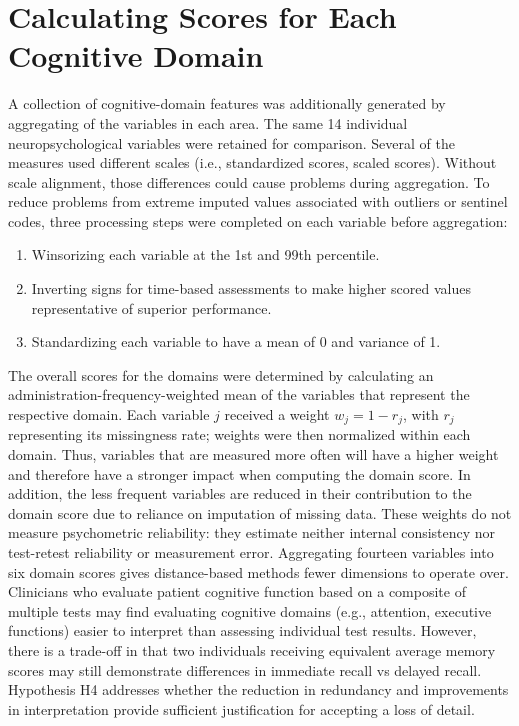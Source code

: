 \section{Calculating Scores for Each Cognitive Domain}\label{sec:domain_scores}
A collection of cognitive-domain features was additionally generated by aggregating of the variables in each area. The same 14 individual neuropsychological variables were retained for comparison. Several of the measures used different scales (i.e., standardized scores, scaled scores). Without scale alignment, those differences could cause problems during aggregation. To reduce problems from extreme imputed values associated with outliers or sentinel codes, three processing steps were completed on each variable before aggregation:

\begin{enumerate}
\item Winsorizing each variable at the 1st and 99th percentile.
\item Inverting signs for time-based assessments to make higher scored values representative of superior performance.
\item Standardizing each variable to have a mean of 0 and variance of 1.
\end{enumerate}

The overall scores for the domains were determined by calculating an administration-frequency-weighted mean of the variables that represent the respective domain. Each variable \(j\) received a weight \(w_j = 1 - r_j\), with \(r_j\) representing its missingness rate; weights were then normalized within each domain. Thus, variables that are measured more often will have a higher weight and therefore have a stronger impact when computing the domain score. In addition, the less frequent variables are reduced in their contribution to the domain score due to reliance on imputation of missing data. These weights do not measure psychometric reliability: they estimate neither internal consistency nor test-retest reliability or measurement error. Aggregating fourteen variables into six domain scores gives distance-based methods fewer dimensions to operate over. Clinicians who evaluate patient cognitive function based on a composite of multiple tests may find evaluating cognitive domains (e.g., attention, executive functions) easier to interpret than assessing individual test results. However, there is a trade-off in that two individuals receiving equivalent average memory scores may still demonstrate differences in immediate recall vs delayed recall. Hypothesis H4 addresses whether the reduction in redundancy and improvements in interpretation provide sufficient justification for accepting a loss of detail.


